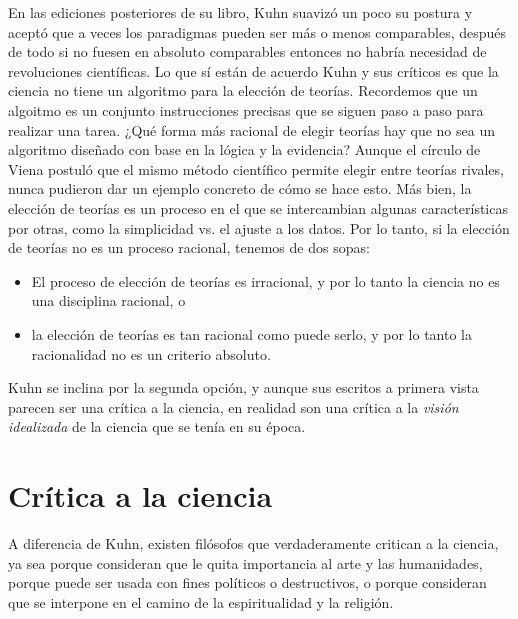 En las ediciones posteriores de su libro, Kuhn suavizó un poco su postura y
aceptó que a veces los paradigmas pueden ser más o menos comparables, después de
todo si no fuesen en absoluto comparables entonces no habría necesidad de
revoluciones científicas.
Lo que sí están de acuerdo Kuhn y sus críticos es que la ciencia no tiene un
algoritmo para la elección de teorías.
Recordemos que un algoitmo es un conjunto instrucciones precisas que se siguen
paso a paso para realizar una tarea.
¿Qué forma más racional de elegir teorías hay que no sea un algoritmo diseñado
con base en la lógica y la evidencia?
Aunque el círculo de Viena postuló que el mismo método científico permite
elegir entre teorías rivales, nunca pudieron dar un ejemplo concreto de cómo se
hace esto.
Más bien, la elección de teorías es un proceso en el que se intercambian algunas
características por otras, como la simplicidad vs. el ajuste a los datos.
Por lo tanto, si la elección de teorías no es un proceso racional, tenemos de
dos sopas:
\begin{itemize}
    \item El proceso de elección de teorías es irracional, y por lo tanto la
          ciencia no es una disciplina racional, o
    \item la elección de teorías es tan racional como puede serlo, y por lo
          tanto la racionalidad no es un criterio absoluto.
\end{itemize}
Kuhn se inclina por la segunda opción, y aunque sus escritos a primera vista
parecen ser una crítica a la ciencia, en realidad son una crítica a la
\emph{visión idealizada} de la ciencia que se tenía en su época.


\section{Crítica a la ciencia}
\label{sec:criticaalaciencia}
A diferencia de Kuhn, existen filósofos que verdaderamente critican a la
ciencia, ya sea porque consideran que le quita importancia al arte y las
humanidades, porque puede ser usada con fines políticos o destructivos, o porque
consideran que se interpone en el camino de la espiritualidad y la religión.

